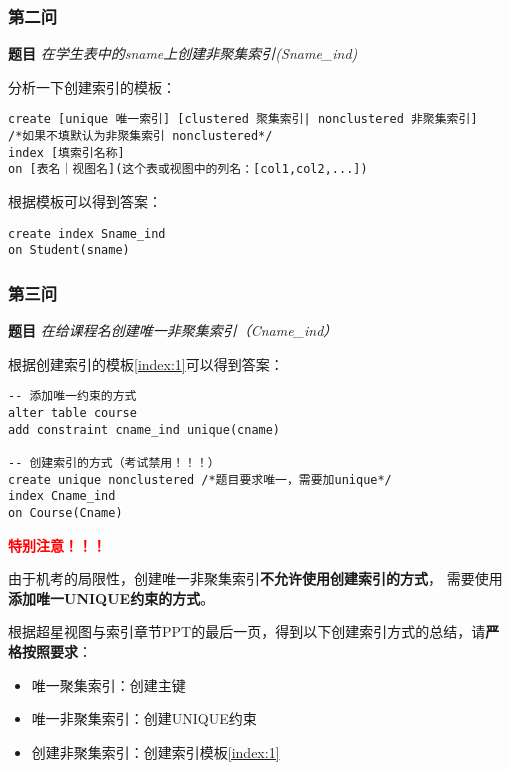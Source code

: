 \subsubsection{第二问}

\textbf{题目} \emph{在学生表中的sname上创建非聚集索引(Sname\_ind)}

\qquad 分析一下创建索引的模板：

\begin{mdframed}[backgroundcolor=gray!10]
  \label{index:1}
\begin{verbatim}
create [unique 唯一索引] [clustered 聚集索引| nonclustered 非聚集索引]
/*如果不填默认为非聚集索引 nonclustered*/
index [填索引名称]
on [表名｜视图名](这个表或视图中的列名：[col1,col2,...])
\end{verbatim}
\end{mdframed}

\qquad 根据模板可以得到答案：

\begin{mdframed}[backgroundcolor=blue!5]
\begin{verbatim}
create index Sname_ind
on Student(sname)
\end{verbatim}
\end{mdframed}

\subsubsection{第三问}

\textbf{题目} \emph{在给课程名创建唯一非聚集索引（Cname\_ind）}

\qquad 根据创建索引的模板\ref{index:1}可以得到答案：

\begin{mdframed}[backgroundcolor=blue!5]
\begin{verbatim}
-- 添加唯一约束的方式
alter table course
add constraint cname_ind unique(cname)

-- 创建索引的方式（考试禁用！！！）
create unique nonclustered /*题目要求唯一，需要加unique*/
index Cname_ind
on Course(Cname)
\end{verbatim}
\end{mdframed}

\begin{mdframed}[backgroundcolor=yellow!10]
  \textbf{ \textcolor{Red}{特别注意！！！}}

  \qquad 由于机考的局限性，创建唯一非聚集索引\textbf{不允许使用创建索引的方式}，
  需要使用\textbf{添加唯一UNIQUE约束的方式}。

  \qquad 根据超星视图与索引章节PPT的最后一页，得到以下创建索引方式的总结，请\textbf{严格按照要求}：
  \begin{itemize}
    \item 唯一聚集索引：创建主键
    \item 唯一非聚集索引：创建UNIQUE约束
    \item 创建非聚集索引：创建索引模板\ref{index:1}
  \end{itemize}
\end{mdframed}

